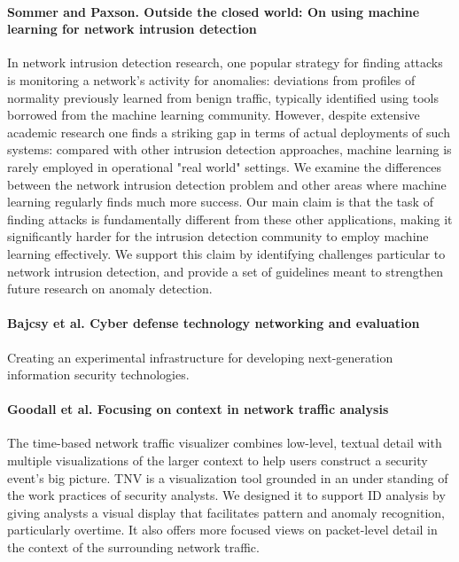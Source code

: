 \paragraph*{Sommer and Paxson. Outside the closed world: On using machine learning for network intrusion detection}
\cite{sommer2010outside}
In network intrusion detection research, one popular strategy for finding attacks is monitoring a network's activity for anomalies: deviations from profiles of normality previously learned from benign traffic, typically identified using tools borrowed from the machine learning community. However, despite extensive academic research one finds a striking gap in terms of actual deployments of such systems: compared with other intrusion detection approaches, machine learning is rarely employed in operational "real world" settings. We examine the differences between the network intrusion detection problem and other areas where machine learning regularly finds much more success. Our main claim is that the task of finding attacks is fundamentally different from these other applications, making it significantly harder for the intrusion detection community to employ machine learning effectively. We support this claim by identifying challenges particular to network intrusion detection, and provide a set of guidelines meant to strengthen future research on anomaly detection.

\paragraph*{Bajcsy et al. Cyber defense technology networking and evaluation}
\cite{bajcsy2004cyber}
Creating an experimental infrastructure for developing next-generation information security technologies.

\paragraph*{Goodall et al. Focusing on context in network traffic analysis}
\cite{goodall2006focusing}
The time-based network traffic visualizer combines low-level, textual detail with multiple visualizations of the larger context to help users construct a security event's big picture. TNV is a visualization tool grounded in an under standing of the work practices of security analysts. We designed it to support ID analysis by giving analysts a visual display that facilitates pattern and anomaly recognition, particularly overtime. It also offers more focused views on packet-level detail in the context of the surrounding network traffic.

